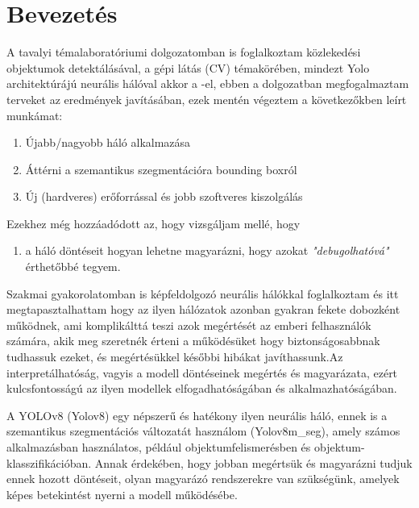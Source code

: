 \documentclass[12pt,oneside,a4paper]{article}
\title{\titletext}
\author{Nyilas Péter}
\date{\today}
\newcommand{\newsection}[1]{\clearpage\section{#1}}\label{makro}
\theoremstyle{remark}
\begin{document}
\maketitle
\newpage
\tableofcontents\label{ossz:tartalomjegyzek}
\newpage
\newsection{Bevezetés}\label{sec:bevezetes}
\pagestyle{fancy}
    A tavalyi témalaboratóriumi dolgozatomban is foglalkoztam közlekedési objektumok detektálásával,
    a gépi látás (\ac{CV}) témakörében, mindezt Yolo architektúrájú neurális hálóval akkor a
-el, ebben a dolgozatban megfogalmaztam terveket az eredmények javításában, ezek mentén végeztem
a következőkben leírt munkámat:
\begin{enumerate}[label=\alph*., start=1]\label{enum:tervek}
    \item Újabb/nagyobb háló alkalmazása
    \item Áttérni a szemantikus szegmentációra bounding boxról
    \item Új (hardveres) erőforrással és jobb szoftveres kiszolgálás
\end{enumerate}
Ezekhez még hozzáadódott az, hogy vizsgáljam mellé, hogy
\begin{enumerate}[label=\alph*., start=3]
    \item a háló döntéseit hogyan lehetne magyarázni, hogy azokat \textit{"debugolhatóvá"} érthetőbbé tegyem.
\end{enumerate}


    Szakmai gyakorolatomban is képfeldolgozó neurális hálókkal foglalkoztam és itt megtapasztalhattam hogy az ilyen
    hálózatok azonban gyakran fekete    dobozként működnek, ami komplikálttá teszi azok megértését az
    emberi felhasználók számára, akik meg szeretnék érteni    a működésüket hogy biztonságosabbnak tudhassuk ezeket,
    és megértésükkel későbbi hibákat javíthassunk.Az interpretálhatóság, vagyis a modell döntéseinek megértés
    és magyarázata, ezért kulcsfontosságú az ilyen modellek elfogadhatóságában és alkalmazhatóságában.

    A YOLOv8 (\gls{Yolov8}) egy népszerű és hatékony ilyen neurális háló,
    ennek is a szemantikus szegmentációs változatát használom (Yolov8m\_seg), amely számos alkalmazásban használatos,
    például objektumfelismerésben és objektum-klasszifikációban.
    Annak érdekében, hogy jobban megértsük és magyarázni
    tudjuk ennek hozott döntéseit, olyan magyarázó rendszerekre van szükségünk, amelyek képes betekintést nyerni a
    modell működésébe.
\end{document}
